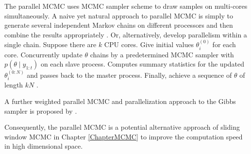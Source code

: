 The parallel MCMC uses MCMC sampler scheme to draw samples on multi-cores simultaneously. A naive yet natural approach to parallel MCMC is simply to generate several independent Markov chains on different
processors and then combine the results appropriately \citep{bradford1996markov, gelman1992inference}. Or, alternatively, develop parallelism within a single chain. Suppose there are $k$ CPU cores. Give initial values $\theta_i^{(0)}$ for each core. Concurrently update $\theta$ chains by a predetermined MCMC sampler with $p(\theta\mid y_{1:t})$ on each slave process. Computes summary statistics for the updated $\theta_i^{(0: N)}$ and passes back to the master process. Finally, achieve a sequence of $\theta$ of length $kN$ \citep{wu2012parallel}. 

A further weighted parallel MCMC and parallelization approach to the Gibbs sampler is proposed by \cite{vanderwerken2013parallel}.

Consequently, the parallel MCMC is a potential alternative approach of sliding window MCMC in Chapter \ref{ChapterMCMC} to improve the computation speed in high dimensional space. 


